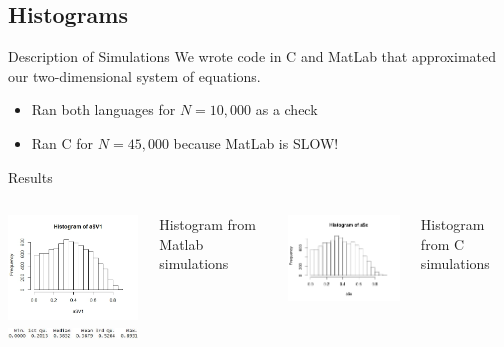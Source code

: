 
\subsection{Histograms}

\begin{frame}{Description of Simulations}
We wrote code in C and MatLab that approximated our two-dimensional system of equations. 
	\begin{itemize}
		\item Ran both languages for $N = 10,000$ as a check
		\item Ran C for $N =45,000$ because MatLab is SLOW!
	\end{itemize}
\end{frame}


\begin{frame}{Results}
 

  \begin{columns}[t]
    \includegraphics[width=6cm]{img/shrimpHistMATLAB} \\
		\includegraphics[width=7cm]{img/histSummML}
    \begin{center} Histogram from Matlab simulations \end{center}
    \includegraphics[width=6cm]{img/Rplot} \\
    \begin{center} Histogram from C simulations \end{center}
  \end{columns}


\end{frame}
